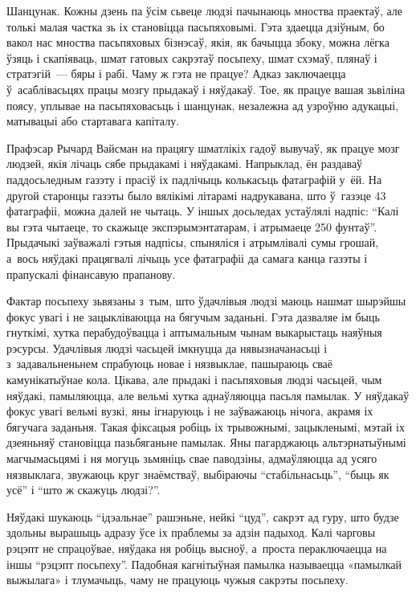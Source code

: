 Шанцунак. Кожны дзень па ўсім сьвеце людзі пачынаюць мноства праектаў, але толькі малая частка зь іх становіцца пасьпяховымі. Гэта здаецца дзіўным, бо вакол нас мноства пасьпяховых бізнэсаў, якія, як бачыцца збоку, можна лёгка ўзяць і скапіяваць, шмат гатовых сакрэтаў посьпеху, шмат схэмаў, плянаў і стратэгій~--- бяры і рабі. Чаму ж гэта не працуе? Адказ заключаецца ў~асаблівасьцях працы мозгу прыдакаў і няўдакаў. Тое, як працуе вашая зьвіліна поясу, уплывае на пасьпяховасьць і шанцунак, незалежна ад узроўню адукацыі, матывацыі або стартавага капіталу. 

Прафэсар Рычард Вайсман на працягу шматлікіх гадоў вывучаў, як працуе мозг людзей, якія лічаць сябе прыдакамі і няўдакамі. Напрыклад, ён раздаваў паддосьледным газэту і прасіў іх падлічыць колькасьць фатаграфій у~ёй. На другой старонцы газэты было вялікімі літарамі надрукавана, што ў~газэце 43 фатаграфіі, можна далей не чытаць. У іншых досьледах устаўлялі надпіс: ``Калі вы гэта чытаеце, то скажыце экспэрымэнтатарам, і атрымаеце 250 фунтаў''. Прыдачыкі заўважалі гэтыя надпісы, спыняліся і атрымлівалі сумы грошай, а~вось няўдакі працягвалі лічыць усе фатаграфіі да самага канца газэты і прапускалі фінансавую прапанову.

Фактар посьпеху зьвязаны з~тым, што ўдачлівыя людзі маюць нашмат шырэйшы фокус увагі і не зацыкліваюцца на бягучым заданьні. Гэта дазваляе ім быць гнуткімі, хутка перабудоўвацца і аптымальным чынам выкарыстаць наяўныя рэсурсы. Удачлівыя людзі часьцей імкнуцца да нявызначанасьці і з~задавальненьнем спрабуюць новае і нязвыклае, пашыраюць сваё камунікатыўнае кола. Цікава, але прыдакі і пасьпяховыя людзі часьцей, чым няўдакі, памыляюцца, але вельмі хутка аднаўляюцца пасьля памылак. У няўдакаў фокус увагі вельмі вузкі, яны ігнаруюць і не заўважаюць нічога, акрамя іх бягучага заданьня. Такая фіксацыя робіць іх трывожнымі, зацыкленымі, мэтай іх дзеяньняў становіцца пазьбяганьне памылак. Яны пагарджаюць альтэрнатыўнымі магчымасьцямі і ня могуць зьмяніць свае паводзіны, адмаўляюцца ад усяго нязвыклага, звужаюць круг знаёмстваў, выбіраючы ``стабільнасьць'', ``быць як усё'' і ``што ж скажуць людзі?''. 

Няўдакі шукаюць ``ідэальнае'' рашэньне, нейкі ``цуд'', сакрэт ад гуру, што будзе здольны вырашыць адразу ўсе іх праблемы за адзін падыход. Калі чарговы рэцэпт не спрацоўвае, няўдака ня робіць высноў, а~проста пераключаецца на іншы ``рэцэпт посьпеху''. Падобная кагнітыўная памылка называецца «памылкай выжылага» і тлумачыць, чаму не працуюць чужыя сакрэты посьпеху. 

